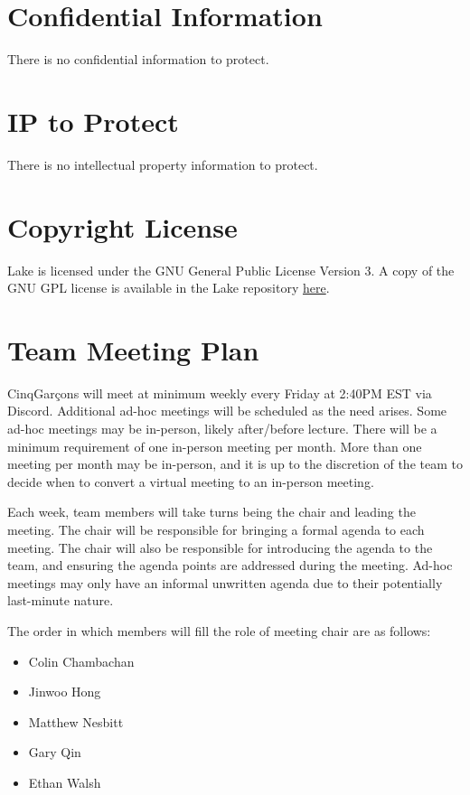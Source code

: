\documentclass{article}
\begin{document}
\section{Confidential Information}

There is no confidential information to protect.

\section{IP to Protect}

There is no intellectual property information to protect.

\section{Copyright License}

Lake is licensed under the GNU General Public License Version 3.
A copy of the GNU GPL license is available in the Lake repository
\href{https://github.com/capstoneCEGJM/Lake/blob/main/LICENSE}
{here}.

\section{Team Meeting Plan}

CinqGarçons will meet at minimum weekly every Friday at 2:40PM EST via Discord. Additional ad-hoc meetings
will be scheduled as the need arises. Some ad-hoc meetings may be in-person, likely after/before
lecture. There will be a minimum requirement of one in-person meeting per month. More than one
meeting per month may be in-person, and it is up to the discretion of the team to decide when to
convert a virtual meeting to an in-person meeting.

\vspace{5mm}

Each week, team members will take turns being the chair and leading the meeting. The chair will be
responsible for bringing a formal agenda to each meeting. The chair will also be responsible for
introducing the agenda to the team, and ensuring the agenda points are addressed during the meeting.
Ad-hoc meetings may only have an informal unwritten agenda due to their potentially last-minute nature.

\vspace{5mm}

The order in which members will fill the role of meeting chair are as follows:
\begin{itemize}
	\item Colin Chambachan
	\item Jinwoo Hong
	\item Matthew Nesbitt
	\item Gary Qin
	\item Ethan Walsh
\end{itemize}
\end{document}

